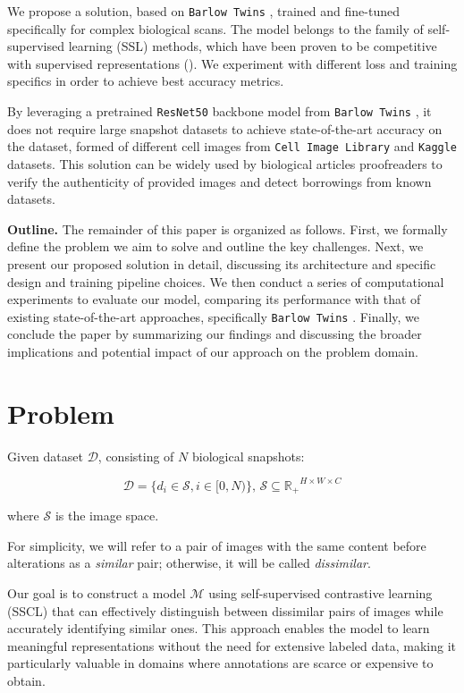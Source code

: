 \documentclass{article}
\begin{document}
We propose a solution, based on \texttt{Barlow Twins} \cite{zbontar2021barlow},
trained and fine-tuned specifically for complex biological scans. 
The model belongs to the family of self-supervised learning (SSL) 
methods, which have been proven to be competitive with supervised representations 
(\cite{melekhov2016}). We experiment with different loss and training specifics in order
to achieve best accuracy metrics.

By leveraging a pretrained \texttt{ResNet50} backbone model from 
\texttt{Barlow Twins} \cite{zbontar2021barlow}, 
it does not require large snapshot datasets to achieve state-of-the-art accuracy 
on the dataset, formed of different cell images from \texttt{Cell Image Library} and \texttt{Kaggle} 
datasets. This solution can be widely used by 
biological articles proofreaders to verify the authenticity of provided images and 
detect borrowings from known datasets. 

\textbf{Outline.} The remainder of this paper is organized as follows. First, we formally define the problem we aim to solve and outline the key challenges. Next, we present our proposed solution in detail, discussing its architecture and specific design and training pipeline choices. We then conduct a series of computational experiments to evaluate our model, comparing its performance with that of existing state-of-the-art approaches, specifically \texttt{Barlow Twins} \cite{zbontar2021barlow}. Finally, we conclude the paper by summarizing our findings and discussing the broader implications and potential impact of our approach on the problem domain.

\section{Problem}\label{sec:problem}

Given dataset $\mathcal{D}$, consisting of $N$ biological snapshots: 

$$ \mathcal{D} = \{d_i \in \mathcal{S}, i \in [0, N)\}, \,
\mathcal{S} \subseteq \mathbb{R_+}^{H \times W \times C} $$

where $\mathcal{S}$ is the image space. 

For simplicity, we will refer to a pair of images with the same content 
before alterations as a \textit{similar} pair; otherwise, it will be called \textit{dissimilar}.

Our goal is to construct a model $\mathcal{M}$ using self-supervised contrastive learning (SSCL) that can effectively distinguish between dissimilar pairs of images while accurately identifying similar ones. This approach enables the model to learn meaningful representations without the need for extensive labeled data, making it particularly valuable in domains where annotations are scarce or expensive to obtain.
\end{document}
